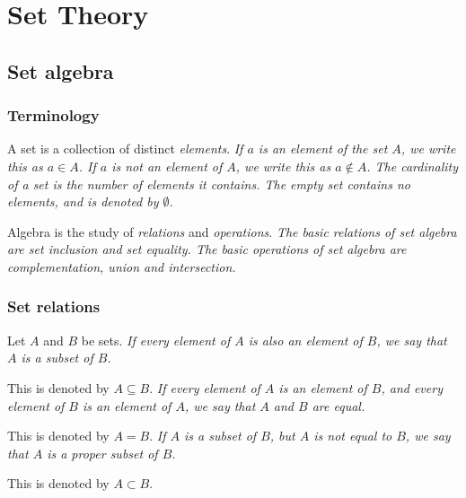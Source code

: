 \chapter{Set Theory}\label{chap:sets}

\section{Set algebra}

\subsection{Terminology}
A set is a collection of distinct \emph{elements}.
\bit
\it If $a$ is an element of the set $A$, we write this as $a\in A$.
\it If $a$ is \emph{not} an element of $A$, we write this as $a\notin A$.
\it The \emph{cardinality} of a set is the number of elements it contains.
\it The \emph{empty set} contains no elements, and is denoted by $\emptyset$.
\eit

Algebra is the study of \emph{relations} and \emph{operations}.
\bit
\it The basic relations of set algebra are \emph{set inclusion} and \emph{set equality}.
\it The basic operations of set algebra are \emph{complementation}, \emph{union} and \emph{intersection}.
\eit

\subsection{Set relations}

\begin{definition}
Let $A$ and $B$ be sets. 
\ben
\it If every element of $A$ is also an element of $B$, we say that $A$ is a \emph{subset} of $B$.
\par This is denoted by $A\subseteq B$.
\it If every element of $A$ is an element of $B$, and every element of $B$ is an element of $A$, we say that $A$ and $B$ are \emph{equal}. 
\par This is denoted by $A=B$.
\it If $A$ is a subset of $B$, but $A$ is not equal to $B$, we say that $A$ is a \emph{proper subset} of $B$. 
\par This is denoted by $A\subset B$.
\een
\end{definition}

